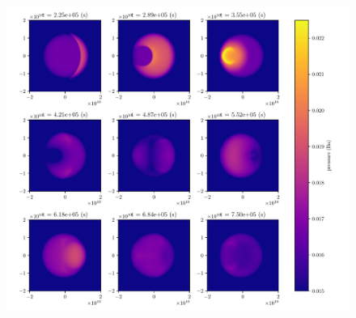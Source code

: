 \documentclass[a4paper]{article}
\begin{document}
\begin{figure}[h]
    \centering
    \includegraphics[width=1\textwidth]{figures/plume_reflection.pdf}
    \caption{}
    \label{fig:figures-plume_reflection-pdf}
\end{figure}
\printbibliography
\end{document}

